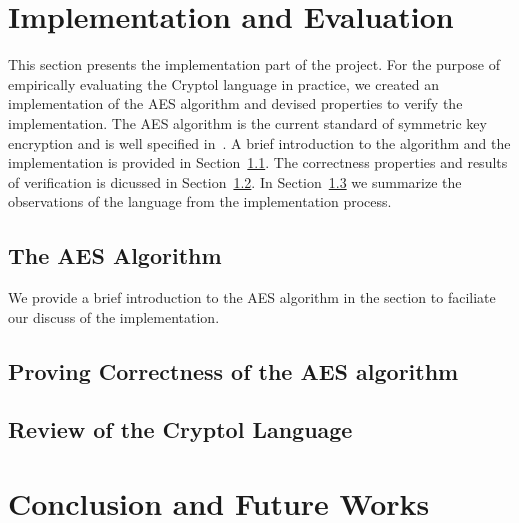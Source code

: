 \documentclass[a4paper, notitlepage]{report}
\begin{document}
\newpage

\chapter{Implementation and Evaluation}

This section presents the implementation part of the project. For the purpose of
empirically evaluating the Cryptol language in practice, we created an implementation
of the AES algorithm and devised properties to verify the implementation.
The AES algorithm is the current standard of symmetric key
encryption and is well specified in~\cite{standard2001announcing}. A brief introduction
to the algorithm and the implementation is provided in Section~\ref{sec:aes}.
The correctness properties and results of verification is dicussed in
Section~\ref{sec:correct}. In Section~\ref{sec:review} we summarize the observations
of the language from the implementation process. 

\section{The AES Algorithm}
\label{sec:aes}

We provide a brief introduction to the AES algorithm in the section to faciliate our
discuss of the implementation. 

\section{Proving Correctness of the AES algorithm}
\label{sec:correct}

\section{Review of the Cryptol Language}
\label{sec:review}


\newpage
\chapter{Conclusion and Future Works}



\newpage



\end{document}
